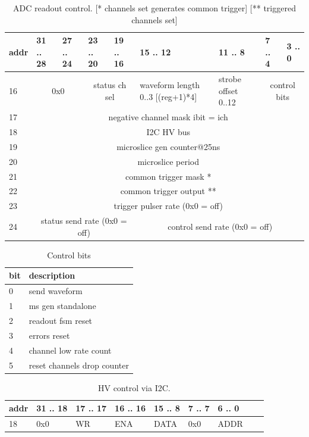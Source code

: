\documentclass{article}
\begin{document}
\begin{table}[H]
\centering
\begin{tabular}{| l | l | l | l | l | l | l | l | l |}
\hline
addr & 31 .. 28 & 27 .. 24 & 23 .. 20 & 19 .. 16 & 15 .. 12 & 11 .. 8 & 7 .. 4 & 3 .. 0 \\ \hline
16 & \multicolumn{2}{c|}{0x0} & \multicolumn{2}{c|}{status ch sel} & waveform length 0..3 [(reg+1)*4] & strobe offset 0..12 & \multicolumn{2}{c|}{control bits} \\ \hline
17 & \multicolumn{8}{c|}{negative channel mask ibit = ich} \\ \hline
18 & \multicolumn{8}{c|}{I2C HV bus} \\ \hline
19 & \multicolumn{8}{c|}{microslice gen counter@25ns} \\ \hline
20 & \multicolumn{8}{c|}{microslice period} \\ \hline
21 & \multicolumn{8}{c|}{common trigger mask *} \\ \hline
22 & \multicolumn{8}{c|}{common trigger output **} \\ \hline
23 & \multicolumn{8}{c|}{trigger pulser rate (0x0 = off)} \\ \hline
24 & \multicolumn{4}{c|}{status send rate (0x0 = off)}& \multicolumn{4}{c|}{control send rate (0x0 = off)} \\ \hline
\end{tabular}
\caption{ADC readout control. [* channels set generates common trigger] [** triggered channels set]\label{tab5}}
\end{table}

\begin{table}[H]
\centering
\begin{tabular}{| l | l |}
\hline
bit & description \\ \hline
0 & send waveform \\ \hline
1 & ms gen standalone \\ \hline
2 & readout fsm reset \\ \hline
3 & errors reset \\ \hline
4 & channel low rate count \\ \hline
5 & reset channels drop counter \\ \hline
\end{tabular}
\caption{Control bits\label{tab6}}
\end{table}


\begin{table}[H]
\centering
\begin{tabular}{| l | l | l | l | l | l | l | l | l |}
\hline
addr & 31 .. 18 & 17 .. 17 & 16 .. 16 & 15 .. 8 & 7 .. 7 & 6 .. 0 \\ \hline
18 & 0x0 & WR & ENA & DATA & 0x0 & ADDR \\ \hline
\end{tabular}
\caption{HV control via I2C.\label{tab7}}
\end{table}
\end{document}
